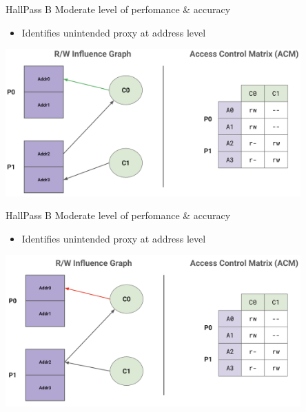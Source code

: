 \begin{frame}{HallPass B}
    Moderate level of perfomance \& accuracy
            \begin{itemize}
                \item Identifies unintended proxy at address level
            \end{itemize}
            \centering
            \includegraphics[height=0.85\textheight,width=0.85\textwidth,keepaspectratio]{images/halllpaass_b_slid1.png}
\end{frame}

\begin{frame}{HallPass B}
    Moderate level of perfomance \& accuracy
            \begin{itemize}
                \item Identifies unintended proxy at address level
            \end{itemize}
            \centering
            \includegraphics[height=0.85\textheight,width=0.85\textwidth,keepaspectratio]{images/hallpass_b_slid2.png}
\end{frame}

